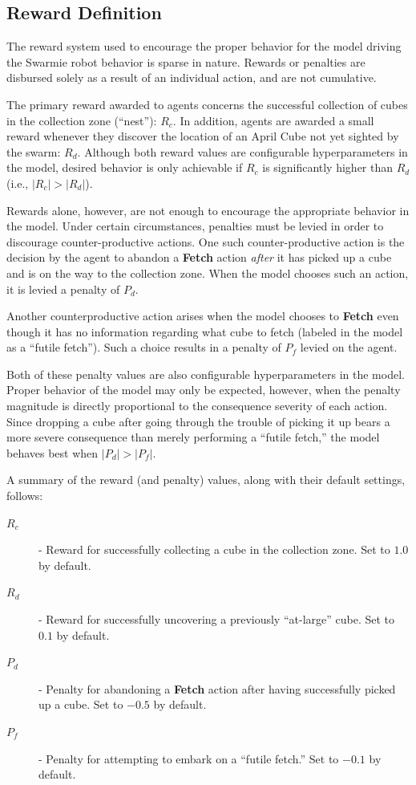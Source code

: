 \documentclass[sigconf,authordraft]{acmart}
\begin{document}
\subsection{Reward Definition}\label{subsec:reward_signal}
The reward system used to encourage the proper behavior for the model driving the Swarmie robot behavior is sparse in nature. Rewards or penalties are disbursed solely as a result of an individual action, and are not cumulative.

The primary reward awarded to agents concerns the successful collection of cubes in the collection zone (``nest''): $R_c$. In addition, agents are awarded a small reward whenever they discover the location of an April Cube not yet sighted by the swarm: $R_d$. Although both reward values are configurable hyperparameters in the model, desired behavior is only achievable if $R_c$ is significantly higher than $R_d$ (i.e., $|R_c| > |R_d|$).

Rewards alone, however, are not enough to encourage the appropriate behavior in the model. Under certain circumstances, penalties must be levied in order to discourage counter-productive actions. One such counter-productive action is the decision by the agent to abandon a \textbf{Fetch} action \textit{after} it has picked up a cube and is on the way to the collection zone. When the model chooses such an action, it is levied a penalty of $P_d$.

Another counterproductive action arises when the model chooses to \textbf{Fetch} even though it has no information regarding what cube to fetch (labeled in the model as a ``futile fetch''). Such a choice results in a penalty of $P_f$ levied on the agent.

Both of these penalty values are also configurable hyperparameters in the model. Proper behavior of the model may only be expected, however, when the penalty magnitude is directly proportional to the consequence severity of each action. Since dropping a cube after going through the trouble of picking it up bears a more severe consequence than merely performing a ``futile fetch,'' the model behaves best when $|P_d| > |P_f|$.

A summary of the reward (and penalty) values, along with their default settings, follows:

\begin{description}
  \item[$R_c$] - Reward for successfully collecting a cube in the collection zone. Set to $1.0$ by default.
  \item[$R_d$] - Reward for successfully uncovering a previously ``at-large'' cube. Set to $0.1$ by default.
  \item[$P_d$] - Penalty for abandoning a \textbf{Fetch} action after having successfully picked up a cube. Set to $-0.5$ by default.
  \item[$P_f$] - Penalty for attempting to embark on a ``futile fetch.'' Set to $-0.1$ by default.   
\end{description}
\end{document}
